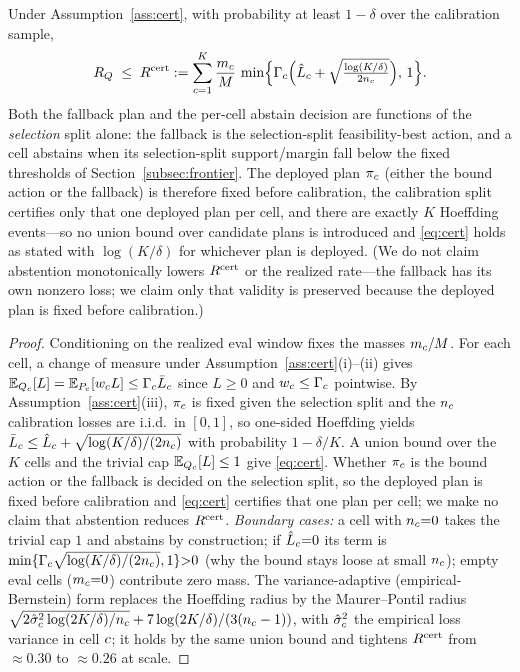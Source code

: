 \begin{proposition}
\label{prop:cert}
Under Assumption~\ref{ass:cert}, with probability at least $1-\delta$ over the calibration sample,
\begin{equation}
\label{eq:cert}
R_Q \;\le\; R^{\mathrm{cert}} := \sum_{c=1}^{K}\frac{m_c}{M}\,
\min\!\Big\{\Gamma_c\Big(\hat L_c + \sqrt{\tfrac{\log(K/\delta)}{2 n_c}}\Big),\,1\Big\}.
\end{equation}
Both the fallback plan and the per-cell abstain decision are functions of the \emph{selection} split alone: the fallback is the selection-split feasibility-best action, and a cell abstains when its selection-split support/margin fall below the fixed thresholds of Section~\ref{subsec:frontier}. The deployed plan $\pi_c$ (either the bound action or the fallback) is therefore fixed before calibration, the calibration split certifies only that one deployed plan per cell, and there are exactly $K$ Hoeffding events---so no union bound over candidate plans is introduced and \eqref{eq:cert} holds as stated with $\log(K/\delta)$ for whichever plan is deployed. (We do not claim abstention monotonically lowers $R^{\mathrm{cert}}$ or the realized rate---the fallback has its own nonzero loss; we claim only that validity is preserved because the deployed plan is fixed before calibration.)
\end{proposition}

\begin{proof}
Conditioning on the realized eval window fixes the masses $m_c/M$. For each cell, a change of measure under Assumption~\ref{ass:cert}(i)--(ii) gives $\mathbb{E}_{Q_c}[L]=\mathbb{E}_{P_c}[w_c L]\le \Gamma_c \bar L_c$ since $L\ge 0$ and $w_c\le\Gamma_c$ pointwise. By Assumption~\ref{ass:cert}(iii), $\pi_c$ is fixed given the selection split and the $n_c$ calibration losses are i.i.d.\ in $[0,1]$, so one-sided Hoeffding yields $\bar L_c\le \hat L_c+\sqrt{\log(K/\delta)/(2 n_c)}$ with probability $1-\delta/K$. A union bound over the $K$ cells and the trivial cap $\mathbb{E}_{Q_c}[L]\le 1$ give \eqref{eq:cert}. Whether $\pi_c$ is the bound action or the fallback is decided on the selection split, so the deployed plan is fixed before calibration and \eqref{eq:cert} certifies that one plan per cell; we make no claim that abstention reduces $R^{\mathrm{cert}}$. \emph{Boundary cases:} a cell with $n_c{=}0$ takes the trivial cap $1$ and abstains by construction; if $\hat L_c{=}0$ its term is $\min\{\Gamma_c\sqrt{\log(K/\delta)/(2n_c)},1\}{>}0$ (why the bound stays loose at small $n_c$); empty eval cells ($m_c{=}0$) contribute zero mass. The variance-adaptive (empirical-Bernstein) form replaces the Hoeffding radius by the Maurer--Pontil radius $\sqrt{2\hat\sigma^2_c\log(2K/\delta)/n_c}+7\log(2K/\delta)/(3(n_c-1))$, with $\hat\sigma^2_c$ the empirical loss variance in cell $c$; it holds by the same union bound and tightens $R^{\mathrm{cert}}$ from $\approx0.30$ to $\approx0.26$ at scale.
\end{proof}

